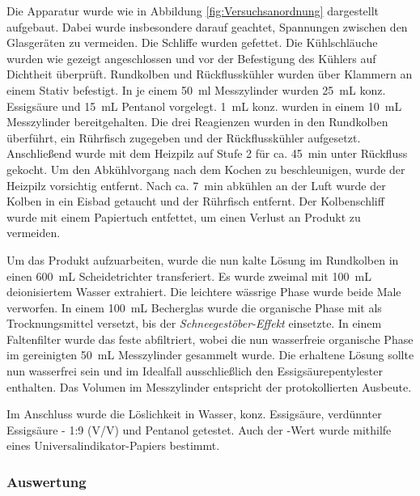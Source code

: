 \documentclass{article}
\begin{document}
        Die Apparatur wurde wie in Abbildung \ref{fig:Versuchsanordnung} dargestellt aufgebaut. Dabei wurde insbesondere darauf geachtet, Spannungen zwischen den Glasgeräten zu vermeiden. Die Schliffe  wurden gefettet. Die Kühlschläuche wurden wie gezeigt angeschlossen und vor der Befestigung des Kühlers auf Dichtheit überprüft. Rundkolben und Rückflusskühler wurden über Klammern an einem Stativ befestigt. In je einem \SI[mode=text,separate-uncertainty]{50}{\milli\litre} Messzylinder wurden \SI[mode=text]{25}{\milli\liter} konz. Essigsäure und \SI[mode=text]{15}{\milli\liter} Pentanol vorgelegt. \SI[mode=text]{1}{\milli\liter} konz.  wurden in einem \SI[mode=text]{10}{\milli\liter} Messzylinder bereitgehalten. Die drei Reagienzen wurden in den Rundkolben überführt, ein Rührfisch zugegeben und der Rückflusskühler aufgesetzt. Anschließend wurde mit dem Heizpilz auf Stufe 2 für ca. \SI[mode=text]{45}{\minute} unter Rückfluss gekocht. Um den Abkühlvorgang nach dem Kochen zu beschleunigen, wurde der Heizpilz vorsichtig entfernt. Nach ca. \SI[mode=text]{7}{\minute} abkühlen an der Luft wurde der Kolben in ein Eisbad getaucht und der Rührfisch entfernt. Der Kolbenschliff wurde mit einem Papiertuch entfettet, um einen Verlust an Produkt zu vermeiden.
        
        Um das Produkt aufzuarbeiten, wurde die nun kalte Lösung im Rundkolben in einen \SI[mode=text]{600}{\milli\liter} Scheidetrichter transferiert. Es wurde zweimal mit \SI[mode=text]{100}{\milli\liter} deionisiertem Wasser extrahiert. Die leichtere wässrige Phase wurde beide Male verworfen. In einem \SI[mode=text]{100}{\milli\liter} Becherglas wurde die organische Phase mit  als Trocknungsmittel versetzt, bis der \textit{Schneegestöber-Effekt} einsetzte. In einem Faltenfilter wurde das feste  abfiltriert, wobei die nun wasserfreie organische Phase im gereinigten \SI[mode=text]{50}{\milli\liter} Messzylinder gesammelt wurde. Die erhaltene Lösung sollte nun wasserfrei sein und im Idealfall ausschließlich den Essigsäurepentylester enthalten. Das Volumen im Messzylinder entspricht der protokollierten Ausbeute. 
        
        Im Anschluss wurde die Löslichkeit in Wasser, konz. Essigsäure, verdünnter Essigsäure - 1:9 (V/V) und Pentanol getestet. Auch der \pH-Wert wurde mithilfe eines Universalindikator-Papiers bestimmt. 
         
      \subsubsection{Auswertung} \label{sec:AuswertungSynthese}
    
\end{document}
